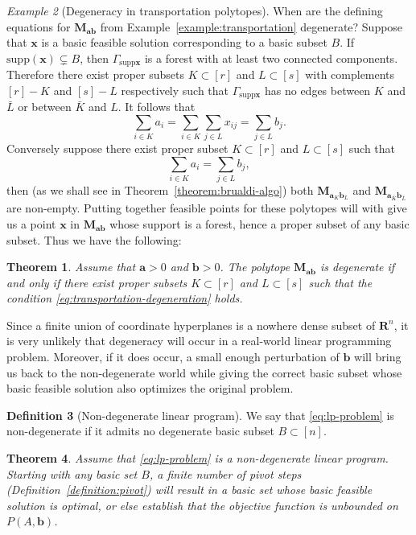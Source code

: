 \documentclass{amsbook}
\newcommand{\xx}{\mathbf x}
\newcommand{\bb}{\mathbf b}
\renewcommand{\aa}{\mathbf a}
\newcommand{\supp}{\mathrm{supp}}
\newcommand{\RR}{\mathbf R}
\newcommand{\MM}{\mathbf M}
\newtheorem{theorem}{Theorem}[section]
\theoremstyle{definition}
\newtheorem{definition}[theorem]{Definition}
\theoremstyle{remark}
\newtheorem{example}[theorem]{Example}
\begin{document}
\begin{example}
  [Degeneracy in transportation polytopes]
  When are the defining equations for $\MM_{\aa\bb}$ from Example~\ref{example:transportation} degenerate?
  Suppose that $\xx$ is a basic feasible solution corresponding to a basic subset $B$.
  If $\supp(\xx)\subsetneq B$, then $\Gamma_{\supp\xx}$ is a forest with at least two connected components.
  Therefore there exist proper subsets $K\subset [r]$ and $L\subset [s]$ with complements $[r]-K$ and $[s]-L$ respectively such that $\Gamma_{\supp\xx}$ has no edges between $K$ and $\bar L$ or between $\bar K$ and $L$.
  It follows that
  \begin{displaymath}
    \sum_{i\in K} a_i = \sum_{i\in K}\sum_{j\in L} x_{ij} = \sum_{j\in L} b_j.
  \end{displaymath}
  Conversely suppose there exist proper subset $K\subset [r]$ and $L\subset [s]$ such that
  \begin{equation}
    \label{eq:transportation-degeneration}
    \sum_{i\in K}a_i = \sum_{j\in L} b_j,
  \end{equation}
  then (as we shall see in Theorem~\ref{theorem:brualdi-algo}) both $\MM_{\aa_K\bb_L}$ and $\MM_{\aa_{\bar K}\bb_{\bar L}}$ are non-empty.
    Putting together feasible points for these polytopes will with give us a point $\xx$ in $\MM_{\aa\bb}$ whose support is a forest, hence a proper subset of any basic subset.
    Thus we have the following:
    \begin{theorem}
      Assume that $\aa>0$ and $\bb>0$.
      The polytope $\MM_{\aa\bb}$ is degenerate if and only if there exist proper subsets $K\subset [r]$ and $L\subset [s]$ such that the condition \eqref{eq:transportation-degeneration} holds.
    \end{theorem}
\end{example}
Since a finite union of coordinate hyperplanes is a nowhere dense subset of $\RR^n$, it is very unlikely that degeneracy will occur in a real-world linear programming problem.
Moreover, if it does occur, a small enough perturbation of $\bb$ will bring us back to the non-degenerate world while giving the correct basic subset whose basic feasible solution also optimizes the original problem.
\begin{definition}[Non-degenerate linear program]
  We say that \eqref{eq:lp-problem} is non-degenerate if it admits no degenerate basic subset $B\subset[n]$.
\end{definition}
\begin{theorem}
  Assume that \eqref{eq:lp-problem} is a non-degenerate linear program.
  Starting with any basic set $B$, a finite number of pivot steps (Definition~\ref{definition:pivot}) will result in a basic set whose basic feasible solution is optimal, or else establish that the objective function is unbounded on $P(A,\bb)$.
\end{theorem}
\end{document}
